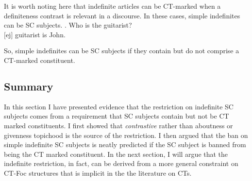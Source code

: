 \documentclass[GPFinal]{subfiles}
\begin{document}
It is worth noting here that indefinite articles can be CT-marked when a definiteness contrast is relevant in a discourse.
In these cases, simple indefinites can be SC subjects.
\ex. Who is the guitarist?\\
$[$ej$]$ guitarist is John.

So, simple indefinites can be SC subjects if they contain but do not comprise a CT-marked constituent.
\subsection{Summary}
In this section I have presented evidence that the restriction on indefinite SC subjects comes from a requirement that SC subjects contain but not be CT marked constituents.
I first showed that \textit{contrastive} rather than aboutness or givenness topichood is the source of the restriction.
I then argued that the ban on simple indefinite SC subjects is neatly predicted if the SC subject is banned from being the CT marked constituent.
In the next section, I will argue that the indefinite restriction, in fact, can be derived from a more general constraint on CT-Foc structures that is implicit in the the literature on CTs.
\end{document}
